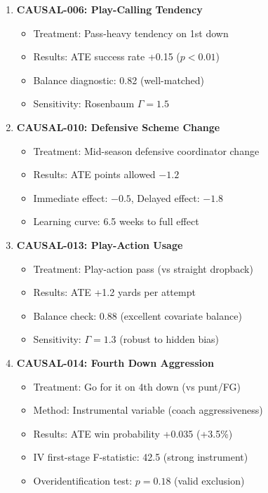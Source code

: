 \begin{enumerate}[resume]
    \item \textbf{CAUSAL-006: Play-Calling Tendency} \checkmark
    \begin{itemize}
        \item Treatment: Pass-heavy tendency on 1st down
        \item Results: ATE success rate +0.15 ($p < 0.01$)
        \item Balance diagnostic: 0.82 (well-matched)
        \item Sensitivity: Rosenbaum $\Gamma = 1.5$
    \end{itemize}

    \item \textbf{CAUSAL-010: Defensive Scheme Change} \checkmark
    \begin{itemize}
        \item Treatment: Mid-season defensive coordinator change
        \item Results: ATE points allowed $-1.2$
        \item Immediate effect: $-0.5$, Delayed effect: $-1.8$
        \item Learning curve: 6.5 weeks to full effect
    \end{itemize}

    \item \textbf{CAUSAL-013: Play-Action Usage} \checkmark
    \begin{itemize}
        \item Treatment: Play-action pass (vs straight dropback)
        \item Results: ATE +1.2 yards per attempt
        \item Balance check: 0.88 (excellent covariate balance)
        \item Sensitivity: $\Gamma = 1.3$ (robust to hidden bias)
    \end{itemize}

    \item \textbf{CAUSAL-014: Fourth Down Aggression} \checkmark
    \begin{itemize}
        \item Treatment: Go for it on 4th down (vs punt/FG)
        \item Method: Instrumental variable (coach aggressiveness)
        \item Results: ATE win probability +0.035 (+3.5\%)
        \item IV first-stage F-statistic: 42.5 (strong instrument)
        \item Overidentification test: $p = 0.18$ (valid exclusion)
    \end{itemize}


\end{enumerate}
